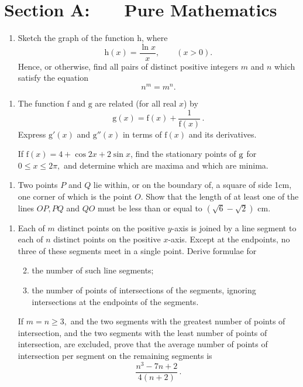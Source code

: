 \documentclass[a4, 11pt]{report}
\newlength{\qspace}
\newcounter{qnumber}
\newenvironment{question}%
 {\vspace{\qspace}
  \begin{enumerate}[\bfseries 1\quad][10]%
    \setcounter{enumi}{\value{qnumber}}%
    \item%
 }
{
  \end{enumerate}
  \filbreak
  \stepcounter{qnumber}
 }
\newenvironment{questionparts}[1][1]%
 {
  \begin{enumerate}[\bfseries (i)]%
    \setcounter{enumii}{#1}
    \addtocounter{enumii}{-1}
    \setlength{\itemsep}{5mm}
    \setlength{\parskip}{8pt}
 }
 {
  \end{enumerate}
 }
\begin{document}
\setcounter{page}{2}

 
\section*{Section A: \ \ \ Pure Mathematics}

\begin{question}
Sketch the graph of the function $\mathrm{h}$, where 
\[
\mathrm{h}(x)=\frac{\ln x}{x},\qquad(x>0).
\]
Hence, or otherwise, find all pairs of distinct positive integers
$m$ and $n$ which satisfy the equation 
\[
n^{m}=m^{n}.
\]

\end{question}

\begin{question}
The function $\mathrm{f}$ and $\mathrm{g}$ are related (for all
real $x$) by 
\[
\mathrm{g}(x)=\mathrm{f}(x)+\frac{1}{\mathrm{f}(x)}\,.
\]
Express $\mathrm{g}'(x)$ and $\mathrm{g}''(x)$ in terms of $\mathrm{f}(x)$
and its derivatives. 


If $\mathrm{f}(x)=4+\cos2x+2\sin x$, find the stationary points of
$\mbox{\ensuremath{\mathrm{g}}}$ for $0\leqslant x\leqslant2\pi,$
and determine which are maxima and which are minima.
\end{question}

\begin{question}
Two points $P$ and $Q$ lie within, or on the boundary of, a square
of side 1cm, one corner of which is the point $O$. Show that the
length of at least one of the lines $OP,PQ$ and $QO$ must be less
than or equal to $(\sqrt{6}-\sqrt{2})$ cm.
\end{question}



\begin{question}
Each of $m$ distinct points on the positive $y$-axis is joined by
a line segment to each of $n$ distinct points on the positive $x$-axis.
Except at the endpoints, no three of these segments meet in a single
point. Derive formulae for 

\begin{questionparts}
\item the number of such line segments; 
\item the number of points of intersections of the segments, ignoring intersections
at the endpoints of the segments. 
\end{questionparts}

If $m=n\geqslant3,$ and the two segments with the greatest number
of points of intersection, and the two segments with the least number
of points of intersection, are excluded, prove that the average number
of points of intersection per segment on the remaining segments is
\[
\frac{n^{3}-7n+2}{4(n+2)}\,.
\]
\end{question}
\end{document}
